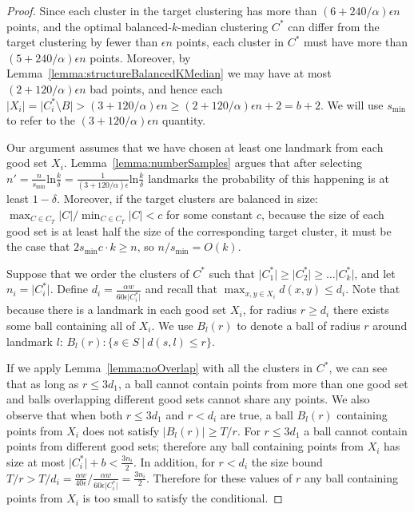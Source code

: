 \documentclass{llncs} \usepackage{algorithm}
\begin{document}
\begin{proof}
Since each cluster in the target clustering has more than
$(6+240/\alpha)\epsilon n$ points, and the optimal balanced-$k$-median clustering $C^{\ast}$ can differ from the target clustering by fewer than $\epsilon n$ points, each cluster in $C^{\ast}$ must have more than $(5+240/\alpha)\epsilon n$ points.  Moreover, by Lemma~\ref{lemma:structureBalancedKMedian} we may have at most $(2+120/\alpha)\epsilon n$ bad points, and hence each $\vert X_{i} \vert = \vert C_{i}^{\ast} \setminus B \vert > (3+120/\alpha)\epsilon n \ge (2+120/\alpha)\epsilon n + 2 = b + 2$.  We will use $s_{\min}$ to refer to the $(3+120/\alpha)\epsilon n$ quantity.

Our argument assumes that we have chosen at least one landmark from each good set $X_{i}$. Lemma~\ref{lemma:numberSamples} argues that after selecting $n' = \frac{n}{s_{\min}}\textrm{ln}\frac{k}{\delta} = \frac{1}{(3+120/\alpha)\epsilon}\textrm{ln}\frac{k}{\delta}$ landmarks the probability of this happening is at least $1-\delta$.  Moreover, if the target clusters are balanced in size: $\max_{C \in C_{T}} \vert C \vert / \min_{C \in C_{T}} \vert C \vert < c$ for some constant $c$, because the size of each good set is at least half the size of the corresponding target cluster, it must be the case that $2s_{\min}c \cdot k \ge n$, so $n/s_{\min} = O(k)$.

Suppose that we order the clusters of $C^{\ast}$ such that $\vert C_{1}^{\ast} \vert \ge \vert C_{2}^{\ast} \vert \ge \ldots \vert C_{k}^{\ast} \vert$, and let $n_{i} = \vert C_{i}^{\ast} \vert$.  Define $d_{i} = \frac{\alpha w}{60 \epsilon \vert C_{i}^{\ast} \vert}$ and recall that $\max_{x,y \in X_{i}} d(x,y) \le d_{i}$.   Note that because there is a landmark in each good set $X_{i}$, for radius $r \ge d_{i}$ there exists some ball containing all of $X_{i}$.  We use $B_{l}(r)$ to denote a ball of radius $r$ around landmark $l$: $B_{l}(r): \lbrace s \in S \ \vert \ d(s,l) \le r \rbrace$.

If we apply Lemma~\ref{lemma:noOverlap} with all the clusters in $C^{\ast}$, we can see that as long as $r \le 3d_{1}$, a ball cannot contain points from more than one good set and balls overlapping different good sets cannot share any points.  We also observe that when both $r \le 3d_{1}$ and $r < d_{i}$ are true, a ball $B_{l}(r)$ containing points from $X_{i}$ does not satisfy $\vert B_{l}(r) \vert \ge T/r$.  For $r \le 3d_{1}$ a ball cannot contain points from different good sets; therefore any ball containing points from $X_{i}$ has size at most $\vert C_{i}^{\ast} \vert + b < \frac{3n_{i}}{2}$.  In addition, for $r < d_{i}$ the size bound $T/r > T / d_{i} = \frac{\alpha w}{40 \epsilon} / \frac{\alpha w}{60 \epsilon \vert C_{i}^{\ast} \vert} = \frac{3 n_{i}}{2}$.  Therefore for these values of $r$ any ball containing points from $X_{i}$ is too small to satisfy the conditional.


\end{proof}
\end{document}

